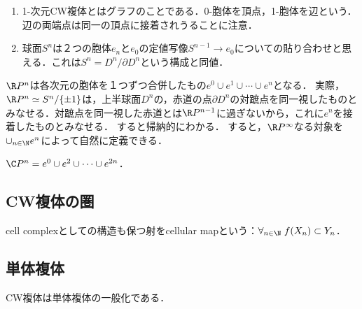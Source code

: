 \documentclass[uplatex, dvipdfmx]{jsreport}
\begin{document}
\begin{example}[自明な対象]\mbox{}
    \begin{enumerate}
        \item 1-次元CW複体とはグラフのことである．0-胞体を頂点，1-胞体を辺という．辺の両端点は同一の頂点に接着されうることに注意．
        \item 球面$S^n$は２つの胞体$e_n$と$e_0$の定値写像$S^{n-1}\to e_0$についての貼り合わせと思える．これは$S^n=D^n/\partial D^n$という構成と同値．
    \end{enumerate}
\end{example}

\begin{example}[実射影空間]
    $\R P^n$は各次元の胞体を１つずつ合併したもの$e^0\cup e^1\cup\cdots\cup e^n$となる．
    実際，$\R P^n\simeq S^n/\{\pm 1\}$は，上半球面$D^n$の，赤道の点$\partial D^n$の対蹠点を同一視したものとみなせる．対蹠点を同一視した赤道とは$\R P^{n-1}$に過ぎないから，これに$e^n$を接着したものとみなせる．
    すると帰納的にわかる．
    すると，$\R P^\infty$なる対象を$\cup_{n\in\N}e^n$によって自然に定義できる．
\end{example}

\begin{example}[複素射影空間]
    $\C P^n=e^0\cup e^2\cup\cdots\cup e^{2n}$．
\end{example}

\subsection{CW複体の圏}

\begin{definition}
    cell complexとしての構造も保つ射をcellular mapという：$\forall_{n\in\N}\;f(X_n)\subset Y_n$．
\end{definition}

\subsection{単体複体}

\begin{tcolorbox}[colframe=ForestGreen, colback=ForestGreen!10!white,breakable,colbacktitle=ForestGreen!40!white,coltitle=black,fonttitle=\bfseries\sffamily,
title=]
    CW複体は単体複体の一般化である．
\end{tcolorbox}
\end{document}
